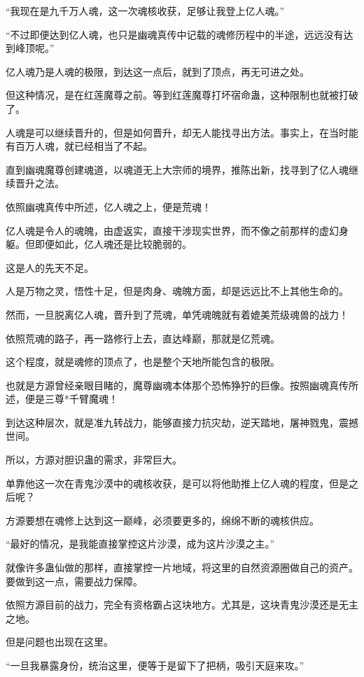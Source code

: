 \begin{this_body}
“我现在是九千万人魂，这一次魂核收获，足够让我登上亿人魂。”

“不过即便达到亿人魂，也只是幽魂真传中记载的魂修历程中的半途，远远没有达到峰顶呢。”

亿人魂乃是人魂的极限，到达这一点后，就到了顶点，再无可进之处。

但这种情况，是在红莲魔尊之前。等到红莲魔尊打坏宿命蛊，这种限制也就被打破了。

人魂是可以继续晋升的，但是如何晋升，却无人能找寻出方法。事实上，在当时能有百万人魂，就已经相当了不起。

直到幽魂魔尊创建魂道，以魂道无上大宗师的境界，推陈出新，找寻到了亿人魂继续晋升之法。

依照幽魂真传中所述，亿人魂之上，便是荒魂！

亿人魂是令人的魂魄，由虚返实，直接干涉现实世界，而不像之前那样的虚幻身躯。但即便如此，亿人魂还是比较脆弱的。

这是人的先天不足。

人是万物之灵，悟性十足，但是肉身、魂魄方面，却是远远比不上其他生命的。

然而，一旦脱离亿人魂，晋升到了荒魂，单凭魂魄就有着媲美荒级魂兽的战力！

依照荒魂的路子，再一路修行上去，直达峰巅，那就是亿荒魂。

这个程度，就是魂修的顶点了，也是整个天地所能包含的极限。

也就是方源曾经亲眼目睹的，魔尊幽魂本体那个恐怖狰狞的巨像。按照幽魂真传所述，便是三尊*千臂魔魂！

到达这种层次，就是准九转战力，能够直接力抗灾劫，逆天踏地，屠神戮鬼，震撼世间。

所以，方源对胆识蛊的需求，非常巨大。

单靠他这一次在青鬼沙漠中的魂核收获，是可以将他助推上亿人魂的程度，但是之后呢？

方源要想在魂修上达到这一巅峰，必须要更多的，绵绵不断的魂核供应。

“最好的情况，是我能直接掌控这片沙漠，成为这片沙漠之主。”

就像许多蛊仙做的那样，直接掌控一片地域，将这里的自然资源圈做自己的资产。要做到这一点，需要战力保障。

依照方源目前的战力，完全有资格霸占这块地方。尤其是，这块青鬼沙漠还是无主之地。

但是问题也出现在这里。

“一旦我暴露身份，统治这里，便等于是留下了把柄，吸引天庭来攻。”


\end{this_body}
